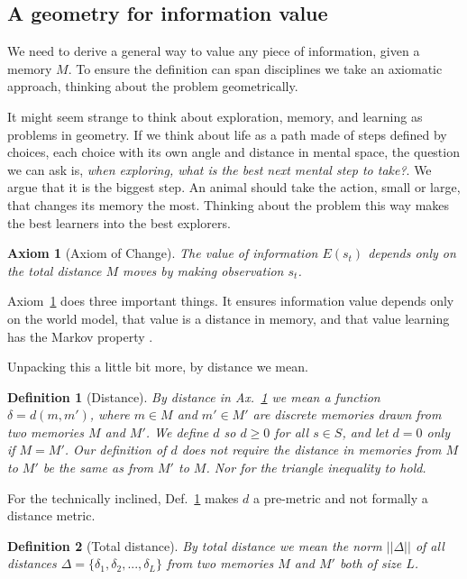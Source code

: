 \documentclass[9pt,lineno]{elife}
\newtheorem{axiom}{Axiom}
\newtheorem{definition}{Definition}
\begin{document}
\subsection*{A geometry for information value}
We need to derive a general way to value any piece of information, given a memory $M$. To ensure the definition can span disciplines we take an axiomatic approach, thinking about the problem geometrically.

It might seem strange to think about exploration, memory, and learning as problems in geometry. If we think about life as a path made of steps defined by choices, each choice with its own angle and distance in mental space, the question we can ask is, \textit{when exploring, what is the best next mental step to take?}. We argue that it is the biggest step. An animal should take the action, small or large, that changes its memory the most. Thinking about the problem this way makes the best learners into the best explorers.

\begin{axiom}[Axiom of Change]
\label{ax:1}
    The value of information $E(s_t)$ depends only on the total distance $M$ moves by making observation $s_t$.
\end{axiom}

\noindent Axiom~\ref{ax:1} does three important things. It ensures information value depends only on the world model, that value is a distance in memory, and that value learning has the Markov property \cite{Sutton2018}. 

Unpacking this a little bit more, by distance we mean.

\begin{definition}[Distance]
\label{def:d}
By distance in Ax.~\ref{ax:1} we mean a function $\delta = d(m,m')$, where $m \in M$ and $m' \in M'$ are discrete memories drawn from two memories $M$ and $M'$. We define $d$ so $d \ge 0$ for all $s \in S$, and let $d = 0$ only if $M = M'$. Our definition of $d$ \textit{does not} require the distance in memories from $M$ to $M'$ be the same as from $M'$ to $M$. Nor for the triangle inequality to hold. 
\end{definition} For the technically inclined, Def.~\ref{def:d} makes $d$ a pre-metric and not formally a distance metric. 

\begin{definition}[Total distance]
\label{def:total}
By total distance we mean the norm $||\Delta||$ of all distances $\Delta = \{\delta_1, \delta_2,...,\delta_L\}$ from two memories $M$ and $M'$ both of size $L$.
\end{definition}
\end{document}
